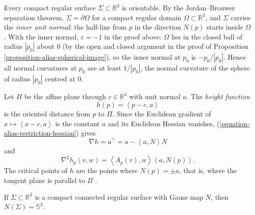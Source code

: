 \begin{remark}
\label{remark-alias-compact-orientable}
Every compact regular surface
$\Sigma\subset\mathbb{R}^3$ is orientable.
By the Jordan--Brouwer separation theorem,
$\Sigma=\partial\Omega$ for a compact
regular domain $\Omega\subset\mathbb{R}^3$,
and $\Sigma$ carries the \emph{inner unit
normal}: the half-line from $p$ in the
direction $N(p)$ starts inside $\Omega$
\cite[Remark 2.2, p.~16]{alias2006analisis}.
With the inner normal, $\varepsilon=-1$ in
the proof above: $\Omega$ lies in the
closed ball of radius $|p_0|$ about $0$ (by
the open and closed argument in the proof
of Proposition
\ref{proposition-alias-spherical-image}),
so the inner normal at $p_0$ is
$-p_0/|p_0|$. Hence all normal curvatures
at $p_0$ are at least $1/|p_0|$, the
normal curvature of the sphere of radius
$|p_0|$ centred at $0$.
\end{remark}

\begin{example}
\label{example-alias-height-function}
Let $\Pi$ be the affine plane through
$c\in\mathbb{R}^3$ with unit normal $a$.
The \emph{height function}
$$
h(p)=\left\langle{} p-c,a
\right\rangle{}
$$
is the oriented distance from $p$ to
$\Pi$. Since the Euclidean gradient of
$x\mapsto\left\langle{} x-c,a
\right\rangle{}$ is the constant $a$ and
its Euclidean Hessian vanishes,
(\ref{equation-alias-restriction-hessian})
gives
\begin{equation}
\label{equation-alias-grad-height}
\nabla h=a^{\top}
=a-\left\langle{} a,N\right\rangle{}N
\end{equation}
and
\begin{equation}
\label{equation-alias-hess-height}
\nabla^2h_p(v,w)=\left\langle{} A_p(v),w
\right\rangle{}\left\langle{} a,N(p)
\right\rangle{}.
\end{equation}
The critical points of $h$ are the points
where $N(p)=\pm a$, that is, where the
tangent plane is parallel to $\Pi$
\cite[Example 1.7,
pp.~11--12]{alias2006analisis}.
\end{example}

\begin{proposition}
\label{proposition-alias-spherical-image}
If $\Sigma\subset\mathbb{R}^3$ is a compact
connected regular surface with Gauss map
$N$, then $N(\Sigma)=\mathbb{S}^2$.
\end{proposition}


